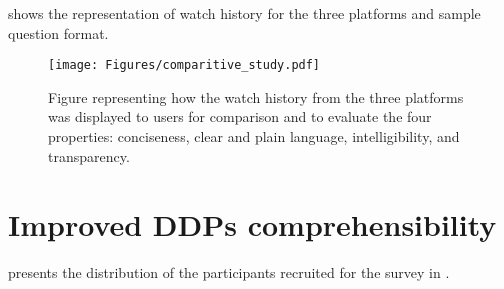 \noindent {} shows the representation of watch history for the three platforms and sample question format. 
\begin{figure*}
    \centering
    \texttt{[image: Figures/comparitive\_study.pdf]}
    \caption{Figure representing how the watch history from the three platforms was displayed to users for comparison and to evaluate the four properties: conciseness, clear and plain language, intelligibility, and transparency. %
    }
    \label{Fig: comparitive_study}
\end{figure*}


\section{Improved DDPs comprehensibility}
\label{appendix:improved_ddps}
 presents the distribution of the participants recruited for the survey in .

